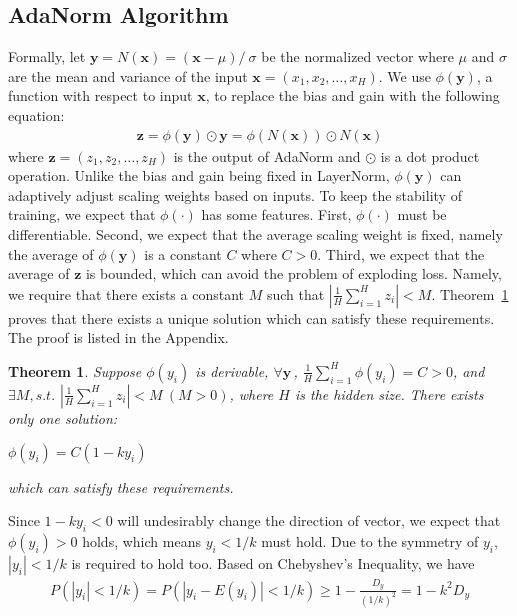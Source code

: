 \documentclass{article}
\newtheorem{thm}{Theorem}[]
\newcommand*{\vect}[1]{\textbf{#1}}
\begin{document}
\subsection{AdaNorm Algorithm}
Formally, let  $\vect{y} = N(\vect{x}) = (\vect{x} - \mu) /\ \sigma$  be the normalized vector  where $\mu$ and $\sigma$ are the mean and variance of the input $\vect{x} = (x_1, x_2, \ldots, x_H)$. We use  $\phi(\vect{y})$, a function with respect to input $\vect{x}$, to replace the bias and gain with the following equation: 
\begin{equation}\begin{aligned}
\vect{z}=\phi(\vect{y}) \odot \vect{y}=\phi(N(\vect{x})) \odot N(\vect{x})
\end{aligned}\end{equation}
where $\vect{z}=(z_1,z_2,\ldots,z_H)$ is the output of AdaNorm and $\odot$ is a dot product operation. Unlike the bias and gain being fixed in LayerNorm, $\phi(\vect{y})$ can adaptively adjust  scaling weights based on  inputs. To keep the stability of training, we expect that $\phi({\cdot})$ has some features. First, $\phi({\cdot})$ must be differentiable. Second, we expect that the average scaling weight is fixed, namely the average of $\phi(\vect{y})$ is a constant $C$ where $C>0$. Third, we expect that the average of $\vect{z}$ is bounded, which can avoid the problem of exploding loss. Namely, we require that there exists a constant $M$ such that $|\frac{1}{H}\sum\limits_{i=1}^{H}z_i|<M$. Theorem~\ref{thm21} proves that there exists a unique solution which can satisfy these requirements. The proof is listed in 
the Appendix.
\begin{thm}
\label{thm21}
Suppose $\phi(y_i)$ is derivable, $\forall \vect{y}\,$,  $\frac{1}{H}\sum\limits_{i=1}^{H}\phi(y_i)=C>0$, and $\exists M, s.t.$ $|\frac{1}{H}\sum\limits_{i=1}^{H}z_i|<M\ (M>0)$, where $H$ is the hidden size. There exists only one solution:
\begin{center}
   $\phi(y_i)=C(1-ky_i)$
\end{center}
which can satisfy these requirements.
\end{thm}
Since $1-ky_i<0$  will undesirably change the direction of vector, we expect that $\phi(y_i)>0$ holds, which means $y_i<1/k$ must hold. Due to the symmetry of $y_i$, $|y_i|<1/k$ is required to hold too. Based on Chebyshev's Inequality, we have 
\begin{equation}\begin{aligned}
P(|y_i|<1/k)=P(|y_i-E(y_i)|<1/k)\ge1-\frac{D_y}{(1/k)^2}=1-k^2D_y
\label{inq}
\end{aligned}\end{equation}
\end{document}
